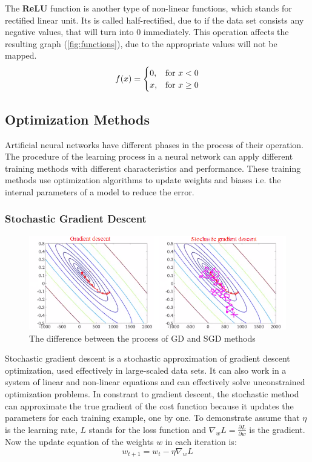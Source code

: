 The \textbf{ReLU} function is another type of non-linear functions, which stands for rectified linear unit. Its is called half-rectified, due to if the data set consists any negative values, that will turn into 0 immediately. This operation affects the resulting graph (\autoref{fig:functions}), due to the appropriate values will not be mapped.
$$ f(x) = \begin{cases} 0, & \hbox{for}~ x < 0 \\ x, & \hbox{for}~ x \geq 0 \end{cases} $$



\subsection{Optimization Methods}

Artificial neural networks have different phases in the process of their operation. The procedure of the learning process in a neural network can apply different training methods with different characteristics and performance. These training methods use optimization algorithms to update weights and biases i.e. the internal parameters of a model to reduce the error. \cite{veerarajan2007numerical}\cite{pillo2013nonlinear}



\subsubsection{Stochastic Gradient Descent}

\begin{figure}[h]
	\centering
	\includegraphics[height=0.28\linewidth]{./figures/stochastic}
	\caption{The difference between the process of GD and SGD methods}
	\label{fig:stochastic}
\end{figure}
Stochastic gradient descent \cite{Bottou2012} is a stochastic approximation of gradient descent optimization, used effectively in large-scaled data sets. It can also work in a system of linear and non-linear equations and can effectively solve unconstrained optimization problems. In constrant to gradient descent, the stochastic method can approximate the true gradient of the cost function because it updates the parameters for each training example, one by one. To demonstrate assume that $\eta$ is the learning rate, $L$ stands for the loss function and $\nabla_w L = \frac{\partial L}{\partial w}$ is the gradient. Now the update equation of the weights $w$ in each iteration is:
\begin{equation} w_{t+1} = w_t - \eta \nabla_w L \label{eq:sgd} \end{equation} 

